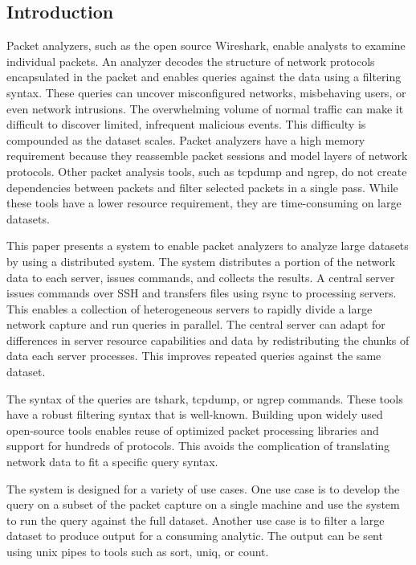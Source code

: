 \documentclass{article}
\begin{document}
\begin{multicols}{2}
  
\section*{Introduction} %


Packet analyzers, such as the open source Wireshark, enable analysts to examine individual packets.  An analyzer decodes the structure of network protocols encapsulated in the packet and enables queries against the data using a filtering syntax.  These queries can uncover misconfigured networks, misbehaving users, or even network intrusions. The overwhelming volume of normal traffic can make it difficult to discover limited, infrequent malicious events. This difficulty is compounded as the dataset scales. Packet analyzers have a high memory requirement because they reassemble packet sessions and model layers of network protocols.  Other packet analysis tools, such as tcpdump and ngrep, do not create dependencies between packets and filter selected packets in a single pass. While these tools have a lower resource requirement, they are time-consuming on large datasets. 

This paper presents a system to enable packet analyzers to analyze large datasets by using a distributed system. The system distributes a portion of the network data to each server, issues commands, and collects the results. A central server issues commands over SSH and transfers files using rsync to processing servers. This enables a collection of heterogeneous servers to rapidly divide a large network capture and run queries in parallel. The central server can adapt for differences in server resource capabilities and data by redistributing the chunks of data each server processes. This improves repeated queries against the same dataset. 

The syntax of the queries are tshark, tcpdump, or ngrep commands. These tools have a robust filtering syntax that is well-known. Building upon widely used open-source tools enables reuse of optimized packet processing libraries and support for hundreds of protocols. This avoids the complication of translating network data to fit a specific query syntax.  

The system is designed for a variety of use cases. One use case is to develop the query on a subset of the packet capture on a single machine and use the system to run the query against the full dataset.  Another use case is to filter a large dataset to produce output for a consuming analytic. The output can be sent using unix pipes to tools such as sort, uniq, or count. 


\end{multicols}
\end{document}

